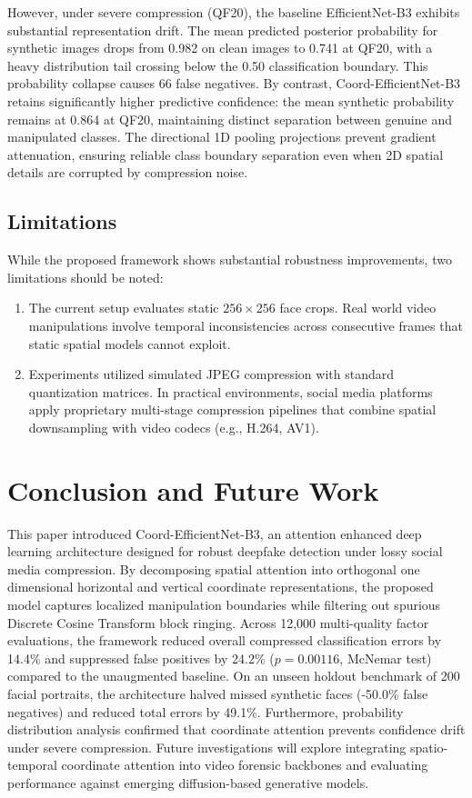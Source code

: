 \documentclass[conference]{IEEEtran}
\begin{document}
However, under severe compression (QF20), the baseline EfficientNet-B3 exhibits substantial representation drift. The mean predicted posterior probability for synthetic images drops from 0.982 on clean images to 0.741 at QF20, with a heavy distribution tail crossing below the 0.50 classification boundary. This probability collapse causes 66 false negatives. By contrast, Coord-EfficientNet-B3 retains significantly higher predictive confidence: the mean synthetic probability remains at 0.864 at QF20, maintaining distinct separation between genuine and manipulated classes. The directional 1D pooling projections prevent gradient attenuation, ensuring reliable class boundary separation even when 2D spatial details are corrupted by compression noise.

\subsection{Limitations}
While the proposed framework shows substantial robustness improvements, two limitations should be noted:
\begin{enumerate}
    \item The current setup evaluates static $256 \times 256$ face crops. Real world video manipulations involve temporal inconsistencies across consecutive frames that static spatial models cannot exploit.
    \item Experiments utilized simulated JPEG compression with standard quantization matrices. In practical environments, social media platforms apply proprietary multi-stage compression pipelines that combine spatial downsampling with video codecs (e.g., H.264, AV1).
\end{enumerate}

\section{Conclusion and Future Work}
This paper introduced Coord-EfficientNet-B3, an attention enhanced deep learning architecture designed for robust deepfake detection under lossy social media compression. By decomposing spatial attention into orthogonal one dimensional horizontal and vertical coordinate representations, the proposed model captures localized manipulation boundaries while filtering out spurious Discrete Cosine Transform block ringing. Across 12,000 multi-quality factor evaluations, the framework reduced overall compressed classification errors by 14.4\% and suppressed false positives by 24.2\% ($p = 0.00116$, McNemar test) compared to the unaugmented baseline. On an unseen holdout benchmark of 200 facial portraits, the architecture halved missed synthetic faces (-50.0\% false negatives) and reduced total errors by 49.1\%. Furthermore, probability distribution analysis confirmed that coordinate attention prevents confidence drift under severe compression. Future investigations will explore integrating spatio-temporal coordinate attention into video forensic backbones and evaluating performance against emerging diffusion-based generative models.
\end{document}

